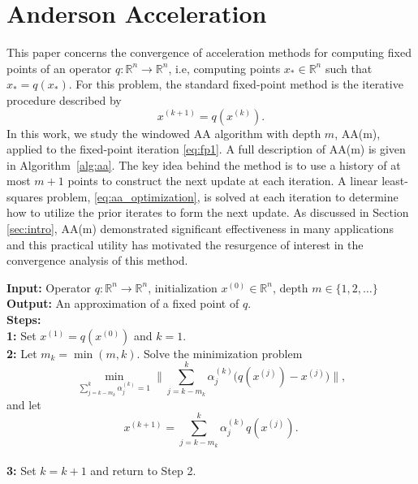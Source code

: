 \documentclass[11pt]{article}
\newcommand{\R}{\mathbb{R}}
\begin{document}
\section{Anderson Acceleration}\label{sec:AA}
This paper concerns the convergence of acceleration methods for computing fixed points of an operator ${q}:\R^n \rightarrow \R^n$, i.e, computing points $x_* \in \R^n$ such that 
$
x_*=q(x_*).
$
For this problem, the standard fixed-point method is the iterative procedure described by 
\begin{equation}\label{eq:fp1}
x^{(k+1)}=q(x^{(k)}).
\end{equation}
In this work, we study the windowed AA algorithm with depth $m$, AA(m), applied to the fixed-point iteration \eqref{eq:fp1}. 
A full description of AA(m) is given in Algorithm~\ref{alg:aa}. 
The key idea behind the method is to use a history of at most $m+1$ points to construct the next update at each iteration. 
A linear least-squares problem, \eqref{eq:aa_optimization}, is solved at each iteration to determine how to utilize the prior iterates to form the next update. %
As discussed in Section \ref{sec:intro}, AA(m) demonstrated significant effectiveness in many applications and this practical utility has motivated the resurgence of interest in the convergence analysis of this method. 
\begin{algorithm}[tb]
\caption{{{Windowed Anderson acceleration algorithm of depth $m$; AA(m)}
}}  
\label{alg:aa}
\begin{flushleft} 
  {\bf Input:}  Operator $q: \R^n\rightarrow\R^n$, initialization $x^{(0)}\in \R^n$, depth $m\in\{1,2,\hdots\}$\\
  {\bf Output:} An {\color{black}approximation of a} fixed point of $q$.\\
  {\bf Steps:}\\
  {\bf 1:} {\color{black}Set $x^{(1)}=q(x^{(0)})$ and $k=1$.}\\ 
  {\bf 2:} Let $m_k=\min(m,k)$. Solve the minimization problem 
\begin{equation}\label{eq:aa_optimization}
\min_{\sum_{j=k-m_k}^{k} \alpha_j^{(k)}=1}\Big\|\sum_{j=k-m_k}^{k}\alpha_j^{(k)}\big(q(x^{(j)})-x^{(j)}\big)\Big\|,
\end{equation}
and let 
\begin{equation}\label{eq:aa_update}
x^{(k+1)}=\sum_{j=k-m_k}^{k}\alpha_j^{(k)} q(x^{(j)}).\nonumber
\end{equation}
  \\
  {\bf 3:} {\color{black}Set $k=k+1$ and return to Step 2.}
  \end{flushleft} 
  \end{algorithm}
\end{document}
